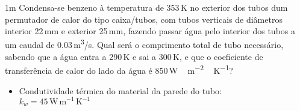 \documentclass[\mainfilename]{subfiles}
\begin{document}
\begin{questionBox}1m{ %
    Condensa-se benzeno à temperatura de 353\,\si{\kelvin} no exterior dos tubos dum permutador de calor do tipo caixa/tubos, com tubos verticais de diâmetros interior 22\,\si{\milli\metre} e exterior 25\,\si{\milli\metre}, fazendo passar água pelo interior dos tubos a um caudal de 0.03\,\si{\metre^3/\second}. Qual será o comprimento total de tubo necessário, sabendo que a água entra a 290\,\si{\kelvin} e sai a 300\,\si{\kelvin}, e que o coeficiente de transferência de calor do lado da água é 850\,\si{\watt\,\metre^{-2}\,\kelvin^{-1}}?
} %
    
    \begin{itemize}
        \item Condutividade térmica do material da parede do tubo:\\
        \(k_w=45\,\si{\watt\,\metre^{-1}\,\kelvin^{-1}}\)
    \end{itemize}


\end{questionBox}
\end{document}
